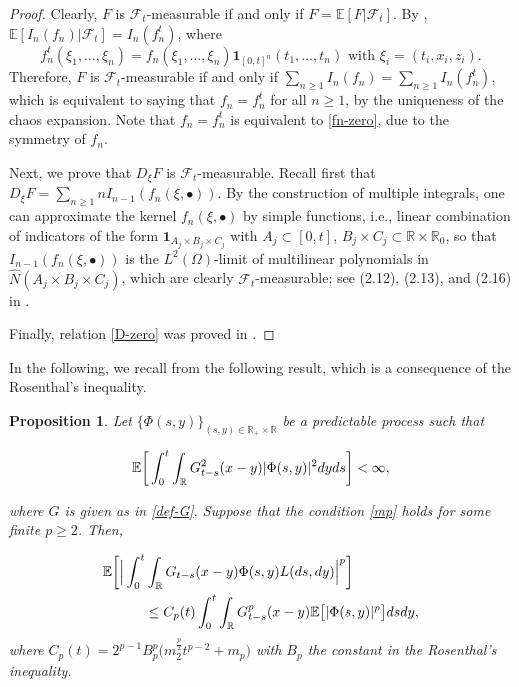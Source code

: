 \documentclass[letterpaper, 11pt,  reqno]{amsart}
\newcommand{\wh}{\widehat}
\newtheorem{proposition}[theorem]{Proposition}
\newcommand{\noi}{\noindent}
\newcommand{\R}{\mathbb{R}}
\newcommand{\bul}{\bullet}
\newcommand{\bE}{\mathbb{E}}
\newcommand{\E}{\mathbb{E}}
\renewcommand{\O}{\Omega}
\newcommand{\ind}{\mathbf 1}
\numberwithin{equation}{section}
\numberwithin{theorem}{section}
\begin{document}
\begin{proof}
Clearly, $F$ is $\mathcal{F}_t$-measurable if and only if $F=\E[F|\mathcal{F}_t]$. 
By \cite[Lemma 2.5-(i)]{BZ23}, $\E[I_n(f_n)|\mathcal{F}_t]=I_n(f_n^t)$, where
\[
f_n^t(\xi_1,\ldots,\xi_n)=f_n(\xi_1,\ldots,\xi_n)\ind_{[0,t]^n}(t_1,\ldots,t_n)
 \,\, \mbox{with $\xi_i=(t_i,x_i,z_i)$}.
\]
Therefore, $F$ is $\mathcal{F}_t$-measurable if and only if 
$\sum_{n\geq 1}I_n(f_n)=\sum_{n\geq 1}I_n(f_n^t)$, 
which is equivalent to saying that $f_n=f_n^t$ for all $n\geq 1$, by the uniqueness of the chaos expansion. Note that $f_n=f_n^t$ is equivalent to \eqref{fn-zero}, due to the symmetry of $f_n$.

Next, we  prove that $D_{\xi}F$ is $\mathcal{F}_t$-measurable.
 Recall first  that $D_\xi F = \sum_{n\geq 1} n I_{n-1} ( f_n(\xi, \bul))$.
By the construction of multiple integrals, one can approximate the kernel $f_n(\xi, \bul)$ by 
simple functions, i.e., linear combination of indicators of the form 
$\ind_{A_j\times B_j\times C_j}$
with $A_j\subset [0,t]$, $B_j\times C_j\subset \R\times\R_0$, so that 
$I_{n-1} ( f_n(\xi, \bul)   )$ is the $L^2(\O)$-limit of multilinear polynomials 
in $\wh{N}(A_j\times B_j\times C_j)$, which are clearly $\mathcal{F}_t$-measurable;
see   (2.12), (2.13), and (2.16) in \cite{BZ23}. 

Finally, relation \eqref{D-zero} was proved in \cite[Lemma 2.5-(ii)]{BZ23}.
\end{proof}


In the following, we recall from \cite[Proposition 2.10]{BZ23}
the following result, which is a consequence of the Rosenthal's inequality.
 
 \begin{proposition}\label{prop_Rose}
 Let $\{\Phi(s,y)\}_{ (s, y) \in \R_+ \times \R}$ be a predictable process such that

\noi
\begin{align}  \notag%
\bE \bigg[ \int_0^t \int_{\R}G_{t-s}^2(x-y)|\Phi(s,y)|^2 dyds \bigg] <\infty,
\end{align}

\noi
where $G$ is given as in \eqref{def-G}.
 Suppose that the condition \eqref{mp} holds  for some finite $p\geq 2$. Then,

\noi
\begin{align}
\begin{aligned}
&\bE \bigg[   \Big| \int_0^t \int_{\R}G_{t-s}(x-y)\Phi(s,y)L(ds,dy) \Big|^p \bigg]  \\
& \qquad\quad
\leq C_{p}(t) \int_0^t \int_{\R}G_{t-s}^p(x-y)\bE \big[  |\Phi(s,y)|^p \big] dsdy,
\end{aligned}
 \notag%
\end{align}
where $C_{p}(t)=2^{p-1}B_p^p\big( m_2^{\frac p2} t^{p-2} + m_p \big)$
with  $B_p$   the constant in the  Rosenthal's inequality.
 \end{proposition}
\end{document}
